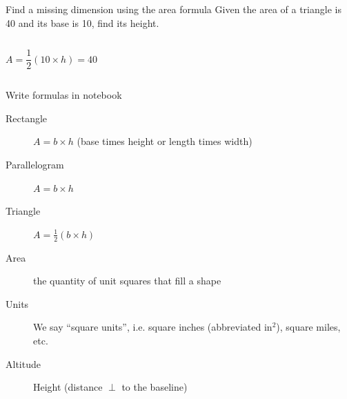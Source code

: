 \documentclass[onlytextwidth]{beamer}
\begin{document}
\begin{frame}{Find a missing dimension using the area formula}
    Given the area of a triangle is 40 and its base is 10, find its height. \vspace{1cm}
    \begin{columns}
        $$A =  \frac{1}{2} (10 \times h) = 40$$
    \end{columns} \vspace{1.5cm}
    \end{frame}

\begin{frame}{Write formulas in notebook}
        \begin{description}
            \item[Rectangle] $A=b \times h$ (base times height or length times width)
            \item[Parallelogram] $A=b \times h$
            \item[Triangle] $A=\frac{1}{2} (b \times h)$ \vspace{0.5cm}
            \item[Area] the quantity of unit squares that fill a shape
            \item[Units] We say ``square units'', i.e. square inches (abbreviated $\text{in}^2$), square miles, etc.
            \item[Altitude] Height (distance $\perp$ to the baseline)
        \end{description}
    \end{frame}
    
\end{document}
